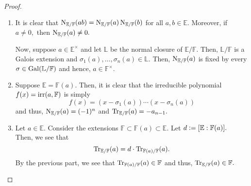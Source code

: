 \propertiesnormtrace*\label{prop:propertiesnormtrace2}
\begin{flushright}\hyperref[prop:propertiesnormtrace]{\upsym}\end{flushright}
\begin{proof}
    \begin{enumerate}[leftmargin=*]
        \item It is clear that $\operatorname{N}_{\mathbb{E}/\mathbb{F}}(ab) = \operatorname{N}_{\mathbb{E}/\mathbb{F}}(a)\operatorname{N}_{\mathbb{E}/\mathbb{F}}(b)$ for all $a, b \in \mathbb{E}.$ Moreover, if $a \neq 0,$ then $\operatorname{N}_{\mathbb{E}/\mathbb{F}}(a) \neq 0.$

        Now, suppose $a \in \mathbb{E}^\times$ and let $\mathbb{L}$ be the normal closure of $\mathbb{E}/\mathbb{F}.$ Then, $\mathbb{L}/\mathbb{F}$ is a Galois extension and $\sigma_1(a), \ldots, \sigma_n(a) \in \mathbb{L}.$ Then, $ \operatorname{N}_{\mathbb{E}/\mathbb{F}}(a)$ is fixed by every $\sigma \in \operatorname{Gal}(\mathbb{L}/\mathbb{F})$ and hence, $a \in \mathbb{F}^\times.$
        \item Suppose $\mathbb{E} = \mathbb{F}(a).$ Then, it is clear that the irreducible polynomial $f(x) = \operatorname{irr}(a, \mathbb{F})$ is simply
        \begin{equation*} 
            f(x) = (x - \sigma_1(a)) \cdots (x - \sigma_n(a))
        \end{equation*}
        and thus, $\operatorname{N}_{\mathbb{E}/\mathbb{F}}(a) = (-1)^n$ and $\operatorname{Tr}_{\mathbb{E}/\mathbb{F}}(a) = -a_{n - 1}.$
        \item Let $a \in \mathbb{E}.$ Consider the extensions $\mathbb{F} \subset \mathbb{F}(a) \subset \mathbb{E}.$ Let $d \vcentcolon= [\mathbb{E} : \mathbb{F}(a)].$ \\
        Then, we see that
        \begin{equation*} 
            \operatorname{Tr}_{\mathbb{E}/\mathbb{F}}(a) = d \cdot \operatorname{Tr}_{\mathbb{F}(a)/\mathbb{F}}(a).
        \end{equation*}
        By the previous part, we see that $\operatorname{Tr}_{\mathbb{F}(a)/\mathbb{F}}(a) \in \mathbb{F}$ and thus, $\operatorname{Tr}_{\mathbb{E}/\mathbb{F}}(a) \in \mathbb{F}.$


\end{enumerate}
\end{proof}
